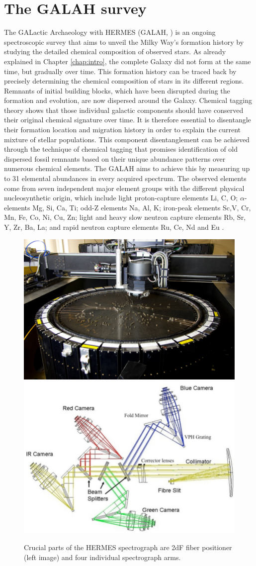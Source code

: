 \section{The GALAH survey}
\label{sec:galah_data}
The GALactic Archaeology with HERMES (GALAH, \cite{2015MNRAS.449.2604D}) is an ongoing spectroscopic survey that aims to unveil the Milky Way’s formation history by studying the detailed chemical composition of observed stars. As already explained in Chapter \ref{chap:intro}, the complete Galaxy did not form at the same time, but gradually over time. This formation history can be traced back by precisely determining the chemical composition of stars in its different regions. Remnants of initial building blocks, which have been disrupted during the formation and evolution, are now dispersed around the Galaxy. Chemical tagging theory \cite{2002ARA&A..40..487F} shows that those individual galactic components should have conserved their original chemical signature over time. It is therefore essential to disentangle their formation location and migration history in order to explain the current mixture of stellar populations. This component disentanglement can be achieved through the technique of chemical tagging that promises identification of old dispersed fossil remnants based on their unique abundance patterns over numerous chemical elements. The GALAH aims to achieve this by measuring up to 31 elemental abundances in every acquired spectrum. The observed elements come from seven independent major element groups with the different physical nucleosynthetic origin, which include light proton-capture elements Li, C, O; $\alpha$-elements Mg, Si, Ca, Ti; odd-Z elements Na, Al, K; iron-peak elements Sc,V, Cr, Mn, Fe, Co, Ni, Cu, Zn; light and heavy slow neutron capture elements Rb, Sr, Y, Zr, Ba, La; and rapid neutron capture elements Ru, Ce, Nd and Eu \cite{2015MNRAS.449.2604D}.

\begin{figure}
	\centering
	\includegraphics[width=0.48\columnwidth]{2df.jpg}
	\includegraphics[width=0.48\columnwidth]{Optical-layout-of-the-HERMES-spectrograph.png}
	\caption{Crucial parts of the HERMES spectrograph are 2dF fiber positioner (left image) and four individual spectrograph arms.}
	\label{fig:hermes_2df}
\end{figure}

